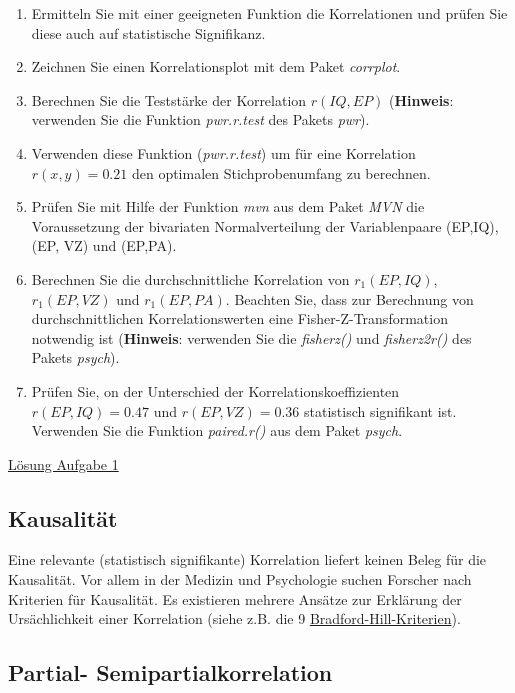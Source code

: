 \documentclass[]{article}
\providecommand{\tightlist}{%
  \setlength{\itemsep}{0pt}\setlength{\parskip}{0pt}}
\begin{document}
\begin{enumerate}
\def\labelenumi{\arabic{enumi}.}
\tightlist
\item
  Ermitteln Sie mit einer geeigneten Funktion die Korrelationen und prüfen Sie diese auch auf statistische Signifikanz.
\item
  Zeichnen Sie einen Korrelationsplot mit dem Paket \emph{corrplot}.
\item
  Berechnen Sie die Teststärke der Korrelation \(r(IQ, EP)\) (\textbf{Hinweis}: verwenden Sie die Funktion \emph{pwr.r.test} des Pakets \emph{pwr}).
\item
  Verwenden diese Funktion (\emph{pwr.r.test}) um für eine Korrelation \(r(x,y) = 0.21\) den optimalen Stichprobenumfang zu berechnen.
\item
  Prüfen Sie mit Hilfe der Funktion \emph{mvn} aus dem Paket \emph{MVN} die Voraussetzung der bivariaten Normalverteilung der Variablenpaare (EP,IQ), (EP, VZ) und (EP,PA).
\item
  Berechnen Sie die durchschnittliche Korrelation von \(r_1(EP,IQ)\), \(r_1(EP,VZ)\) und \(r_1(EP,PA)\). Beachten Sie, dass zur Berechnung von durchschnittlichen Korrelationswerten eine Fisher-Z-Transformation notwendig ist (\textbf{Hinweis}: verwenden Sie die \emph{fisherz()} und \emph{fisherz2r()} des Pakets \emph{psych}).
\item
  Prüfen Sie, on der Unterschied der Korrelationskoeffizienten \(r(EP,IQ) = 0.47\) und \(r(EP,VZ) = 0.36\)
  statistisch signifikant ist. Verwenden Sie die Funktion \emph{paired.r()} aus dem Paket \emph{psych}.
\end{enumerate}

\protect\hyperlink{aufgabe_1}{Lösung Aufgabe 1}

\hypertarget{kausalitat}{%
\subsection*{Kausalität}\label{kausalitat}}

Eine relevante (statistisch signifikante) Korrelation liefert keinen Beleg für die Kausalität. Vor allem in der Medizin und Psychologie suchen Forscher nach Kriterien für Kausalität. Es existieren mehrere Ansätze zur Erklärung der Ursächlichkeit einer Korrelation (siehe z.B. die 9 \href{https://de.wikipedia.org/wiki/\%C3\%84tiologie_(Medizin)}{Bradford-Hill-Kriterien}).

\hypertarget{partial--semipartialkorrelation}{%
\subsection*{Partial- Semipartialkorrelation}\label{partial--semipartialkorrelation}}
\end{document}
